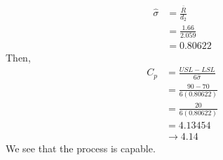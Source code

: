 \documentclass[letterpaper,10pt]{article}
\begin{document}
\begin{enumerate}
\begin{align*}
\hat{\sigma} &= \frac{\bar{R}}{d_2}\\
&=\frac{1.66}{2.059}\\
&=0.80622
\end{align*}
Then,
\begin{align*}
C_p &= \frac{USL-LSL}{6\hat{\sigma}}\\
&=\frac{90-70}{6(0.80622)}\\
&=\frac{20}{6(0.80622)}\\
&=4.13454\\
&\to 4.14
\end{align*}
We see that the process is capable.
\end{enumerate}
\end{document}
